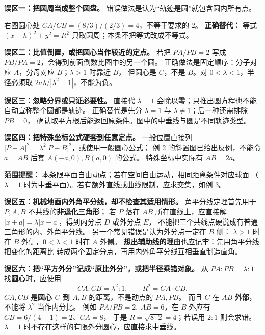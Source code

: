 \clearpage
\begin{trapbox}
\textbf{误区一：把圆周当成整个圆盘。}
错误做法是认为“轨迹是圆”就包含圆内所有点。

右图圆心处 $CA/CB=(8/3)/(2/3)=4$，不等于要求的 $2$。
\textbf{正确替代：} 等式 $(x-h)^2+y^2=R^2$ 只取圆周；本条不把等式改成不等式。

\textbf{误区二：比值倒置，或把圆心当作较近的定点。}
若把 $PA/PB=2$ 写成 $PB/PA=2$，会得到前面倒数比图中的另一个圆。
正确做法是固定顺序：分子对应 $A$，分母对应 $B$；$\lambda>1$ 时靠近 $B$，
但圆心是 $C$，不是 $B$。对 $0<\lambda<1$，半径必须取 $2a\lambda/|\lambda^2-1|$，不能为负。

\textbf{误区三：忽略分界或只证必要性。}
直接代 $\lambda=1$ 会除以零；只推出圆方程也不能自动宣称整个圆都是轨迹。
正确替代是先分 $\lambda=1$ 与 $\lambda\ne1$；后一种还需排除 $PB=0$，
确认取平方根后能返回原条件。图中的中垂线与圆是不同轨迹类型。

\textbf{误区四：把特殊坐标公式硬套到任意定点。}
一般位置直接列 $|P-A|^2=\lambda^2|P-B|^2$，或使用一般圆心公式；
例 2 的斜置图已给出反例，不能令 $a=AB$ 后套 $A(-a,0),B(a,0)$ 的公式。
特殊坐标中实际有 $AB=2a$。

\textbf{范围提醒：} 本条限平面自由动点；若在空间自由运动，相同距离条件对应球面
（$\lambda=1$ 时为中垂平面）。若有额外直线或曲线限制，应求交集，如例 3。


\textbf{误区五：机械地画内外角平分线，却不检查其适用情形。}
角平分线定理首先用于 $P,A,B$ 不共线的\textbf{非退化三角形}；
若 $P$ 落在 $AB$ 所在直线上，应直接解
$|x+a|=\lambda|x-a|$，得到内分点 $D$ 或外分点 $E$，
不能把三个共线点硬说成有普通三角形的内、外角平分线。
另一个常见错误是认为外分点一定在 $B$ 侧：
$\lambda>1$ 时在 $B$ 外侧，$0<\lambda<1$ 时在 $A$ 外侧。
\textbf{想出辅助线的理由}也应记牢：先用角平分线把变化的距离比
转成两个固定分点，再用内外角平分线互相垂直制造直角。


\textbf{误区六：把“平方外分”记成“原比外分”，或把半径乘错对象。}
从 $PA:PB=\lambda:1$ 找\textbf{圆心}时，应使用
\[\boxed{CA:CB=\lambda^2:1},\qquad \boxed{R^2=CA\cdot CB}.\]
$CA,CB$ 是\textbf{圆心 $C$ 到 $A,B$} 的距离，不是动点的 $PA,PB$。
而且 $C$ 在 $AB$ \textbf{外部}，不能将 $\lambda^2$ 当作内分比。
例如 $PA/PB=2,\ AB=6$，在 $B$ 外应有 $CB=6/(4-1)=2$、$CA=8$，
于是 $R=\sqrt{8\cdot2}=4$；若误用 $2:1$ 则会求错。
$\lambda=1$ 时不存在这样的有限外分圆心，应直接求中垂线。
\end{trapbox}
